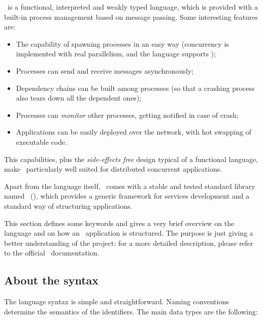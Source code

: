 \Erlang\ is a functional, interpreted and weakly typed language, which
is provided with a built-in process management  based on
message passing. Some interesting features are:
\begin{itemize}
\item   The capability of spawning processes in an easy way
        (concurrency is implemented with real parallelism, and the
        language supports );
\item   Processes can send and receive messages asynchronously;
\item   Dependency chains can be built among processes (so that a
        crashing process also tears down all the dependent ones);
\item   Processes can \emph{monitor} other processes, getting notified
        in case of crash;
\item   Applications can be easily deployed over the network, with hot
        swapping of executable code.
\end{itemize}

This capabilities, plus the \emph{side-effects free} design typical
of a functional language, make \Erlang\ particularly well suited for
distributed concurrent applications.

Apart from the language itself, \Erlang\ comes with a stable and tested
standard library named \OTP\ (\OTPa), which provides a generic framework
for services development and a standard way of structuring applications.

This section defines some keywords and gives a very brief overview on the
language and on how an \Erlang\ application is structured. The purpose is
just giving a better understanding of the project: for a more detailed
description, please refer to the official \Erlang\
documentation\cite{bib:ErlApp}.


\subsection{About the syntax}

The language syntax is simple and straightforward. Naming
conventions determine the semantics of the identifiers. The main data
types are the following:

